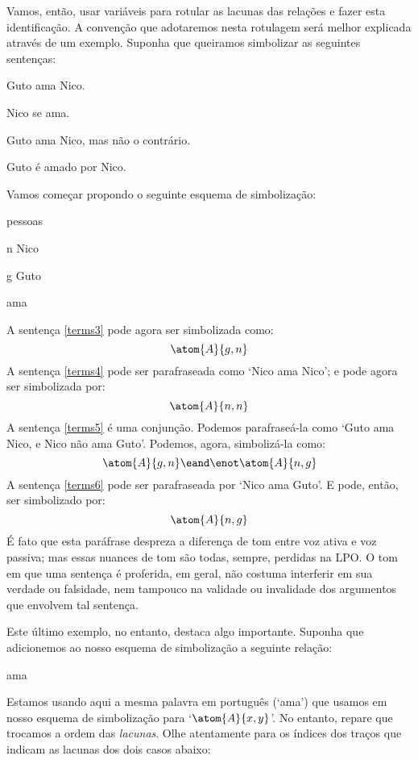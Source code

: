Vamos, então, usar variáveis para rotular as lacunas das relações e fazer esta identificação.
A convenção que adotaremos nesta rotulagem será melhor explicada através de um exemplo.
Suponha que queiramos simbolizar as seguintes sentenças:
	\begin{earg}
		\item[\ex{terms3}] Guto ama Nico.
		\item[\ex{terms4}] Nico se ama.
		\item[\ex{terms5}] Guto ama Nico, mas não o contrário.
		\item[\ex{terms6}] Guto é amado por Nico.
	\end{earg}
Vamos começar propondo o seguinte esquema de simbolização:
\begin{center}
	\begin{ekey}
		\item[\text{domínio}] pessoas
		\item[n] Nico
		\item[g] Guto
		\item[\atom{A}{x,y}]  ama 
	\end{ekey}
\end{center}
A sentença \ref{terms3} pode agora ser simbolizada como:
$$\atom{A}{g,n}$$ 
A sentença \ref{terms4} pode ser parafraseada como `Nico ama Nico'; e pode agora ser simbolizada por: $$\atom{A}{n,n}$$
A sentença \ref{terms5} é uma conjunção.
Podemos parafraseá-la como `Guto ama Nico, e Nico não ama Guto'.
Podemos, agora, simbolizá-la como:
$$\atom{A}{g,n} \eand \enot \atom{A}{n,g}$$
A sentença \ref{terms6} pode ser parafraseada por `Nico ama Guto'.
E pode, então, ser simbolizado por:
$$\atom{A}{n,g}$$
É fato que esta paráfrase despreza a diferença de tom entre voz ativa e voz passiva; mas essas nuances de tom são todas, sempre,  perdidas na LPO.
O tom em que uma sentença é proferida, em geral, não costuma interferir em sua verdade ou falsidade, nem tampouco na validade ou invalidade dos argumentos que envolvem tal sentença. 

Este último exemplo, no entanto, destaca algo importante.
Suponha que adicionemos ao nosso esquema de simbolização a seguinte relação:
\begin{center}
	\begin{ekey}
		\item[\atom{C}{x,y}]  ama \gap{x}
	\end{ekey}
\end{center}
Estamos usando aqui a mesma palavra em português (`ama') que usamos em nosso esquema de simbolização para `$\atom{A}{x,y}$'.
No entanto, repare que trocamos a ordem das \emph{lacunas}.
Olhe atentamente para os índices dos traços que indicam as lacunas dos dois casos abaixo:

